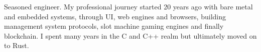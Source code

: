 \par{
Seasoned engineer. My professional journey started 20 years ago with bare metal and embedded systems, through UI, web engines and browsers, building management system protocols, slot machine gaming engines and finally blockchain. I spent many years in the C and C++ realm but ultimately moved on to Rust.
}
